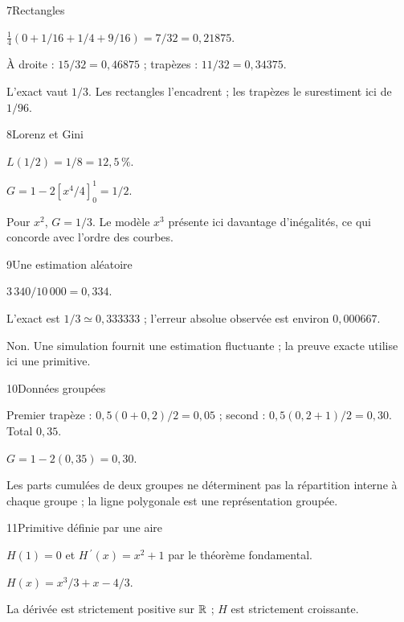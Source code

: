 \begin{corrige}{7}{Rectangles}
\begin{questions}
\item $\frac14(0+1/16+1/4+9/16)=7/32=0{,}21875$.
\item À droite : $15/32=0{,}46875$ ; trapèzes : $11/32=0{,}34375$.
\item L’exact vaut $1/3$. Les rectangles l’encadrent ; les trapèzes le surestiment ici de $1/96$.
\end{questions}
\end{corrige}
\begin{corrige}{8}{Lorenz et Gini}
\begin{questions}
\item $L(1/2)=1/8=12{,}5\,\%$.
\item $G=1-2[x^4/4]_0^1=1/2$.
\item Pour $x^2$, $G=1/3$. Le modèle $x^3$ présente ici davantage d’inégalités, ce qui concorde avec l’ordre des courbes.
\end{questions}
\end{corrige}
\begin{corrige}{9}{Une estimation aléatoire}
\begin{questions}
\item $3\,340/10\,000=0{,}334$.
\item L’exact est $1/3\simeq0{,}333333$ ; l’erreur absolue observée est environ $0{,}000667$.
\item Non. Une simulation fournit une estimation fluctuante ; la preuve exacte utilise ici une primitive.
\end{questions}
\end{corrige}
\begin{corrige}{10}{Données groupées}
\begin{questions}
\item Premier trapèze : $0{,}5(0+0{,}2)/2=0{,}05$ ; second : $0{,}5(0{,}2+1)/2=0{,}30$. Total $0{,}35$.
\item $G=1-2(0{,}35)=0{,}30$.
\item Les parts cumulées de deux groupes ne déterminent pas la répartition interne à chaque groupe ; la ligne polygonale est une représentation groupée.
\end{questions}
\end{corrige}
\begin{corrige}{11}{Primitive définie par une aire}
\begin{questions}
\item $H(1)=0$ et $H\,\!^{\prime}(x)=x^2+1$ par le théorème fondamental.
\item $H(x)=x^3/3+x-4/3$.
\item La dérivée est strictement positive sur $\mathbb{R}$ ; $H$ est strictement croissante.
\end{questions}
\end{corrige}
